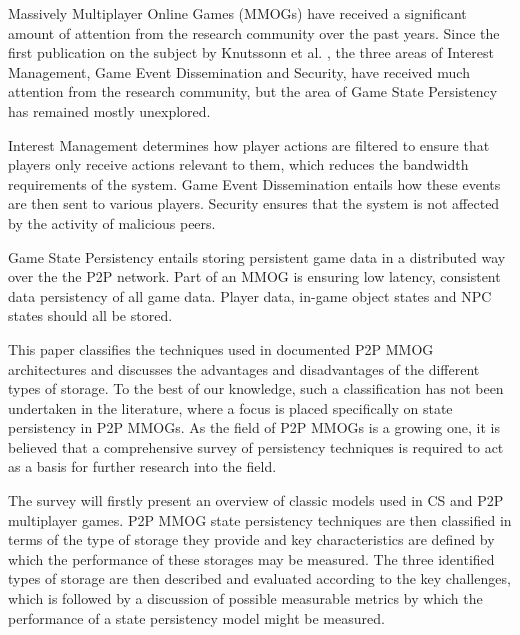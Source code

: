 \documentclass[10pt,a4paper,journal,cspaper,compsoc]{IEEEtran}
\begin{document}
%
%
%
%
 Massively Multiplayer Online Games (MMOGs) have received a significant amount of attention from the research
community over the past years. Since the first publication on the subject by Knutssonn et al. \cite{knutsson_p2p_first}, the three areas of Interest
Management, Game Event Dissemination and Security, have received much attention from the research community, but the area of Game State Persistency
has remained mostly unexplored.

Interest Management determines how player actions are filtered to ensure that players only receive actions relevant to them, which reduces the
bandwidth requirements of the system. Game Event Dissemination entails how these events are then sent to various players. Security ensures that the
system is not affected by the activity of malicious peers.

Game State Persistency entails storing persistent game data in a distributed way over the the P2P network. Part of an MMOG is ensuring low latency,
consistent data persistency of all game data. Player data, in-game object states and \ac{NPC} states should all be stored.

This paper classifies the techniques used in documented P2P MMOG architectures and discusses the advantages and disadvantages of the different types
of storage. To the best of our knowledge, such a classification has not been undertaken in the literature, where a focus is placed specifically on
state persistency in P2P MMOGs. As the field of P2P MMOGs is a growing one, it is believed that a comprehensive survey of persistency techniques is
required to act as a basis for further research into the field.

The survey will firstly present an overview of classic models used in \ac{CS} and P2P multiplayer games. P2P MMOG state persistency techniques are
then classified in terms of the type of storage they provide and key characteristics are defined by which the performance of these storages may be
measured. The three identified types of storage are then described and evaluated according to the key challenges, which is followed by a discussion
of possible measurable metrics by which the performance of a state persistency model might be measured.
\end{document}
